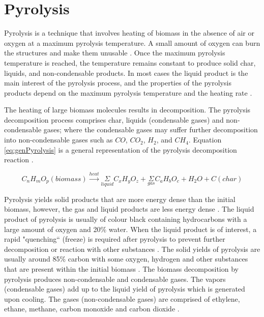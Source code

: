 \section{Pyrolysis} \label{sec:pyrolysis}
Pyrolysis is a technique that involves heating of biomass in the absence of air or oxygen at a maximum pyrolysis temperature. A small amount of oxygen can burn the structures and make them unusable \cite{Pramanick2018}. Once the maximum pyrolysis temperature is reached, the temperature remains constant to produce solid char, liquids, and non-condensable products. In most cases the liquid product is the main interest of the pyrolysis process, and the properties of the pyrolysis products depend on the maximum pyrolysis temperature and the heating rate \cite{Pramanick2018,Basu2018}.

The heating of large biomass molecules results in decomposition. The pyrolysis decomposition process comprises char, liquids (condensable gases) and non-condensable gases; where the condensable gases may suffer further decomposition into non-condensable gases such as $C O$, $C O_{2}$, $H_{2}$, and $C H_{4}$. Equation \ref{eq:genPyrolysis} is a general representation of the pyrolysis decomposition reaction \cite{Basu2018}.

\begin{equation}
C_{n} H_{m} O_{p} (biomass) \overset{heat}{\rightarrow} \underset{liquid}{\Sigma} C_{x} H_{y} O_{z} + \underset{gas}{\Sigma} C_{a} H_{b} O_{c} + H_{2} O + C (char)
\label{eq:genPyrolysis}
\end{equation}

Pyrolysis yields solid products that are more energy dense than the initial biomass, however, the gas and liquid products are less energy dense \cite{Basu2018}. The liquid product of pyrolysis is usually of colour black containing hydrocarbons with a large amount of oxygen and 20\% water. When the liquid product is of interest, a rapid "quenching`` (freeze) is required after pyrolysis to prevent further decomposition or reaction with other substances \cite{Basu2018}. The solid yields of pyrolysis are usually around 85\% carbon with some oxygen, hydrogen and other substances that are present within the initial biomass \cite{Basu2018}. The biomass decomposition by pyrolysis produces non-condensable and condensable gases. The vapors (condensable gases) add up to the liquid yield of pyrolysis which is generated upon cooling. The gases (non-condensable gases) are comprised of ethylene, ethane, methane, carbon monoxide and carbon dioxide \cite{Basu2018}.

